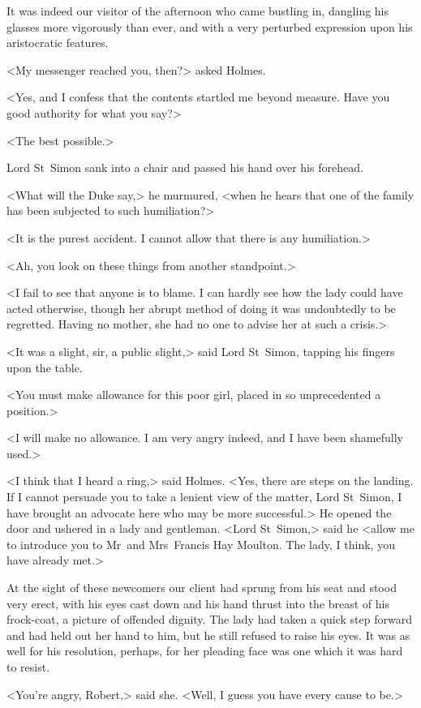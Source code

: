It was indeed our visitor of the afternoon who came bustling in, dangling his glasses more vigorously than ever, and with a very perturbed expression upon his aristocratic features.

<My messenger reached you, then?> asked Holmes.

<Yes, and I confess that the contents startled me beyond measure. Have you good authority for what you say?>

<The best possible.>

Lord St~Simon sank into a chair and passed his hand over his forehead.

<What will the Duke say,> he murmured, <when he hears that one of the family has been subjected to such humiliation?>

<It is the purest accident. I cannot allow that there is any humiliation.>

<Ah, you look on these things from another standpoint.>

<I fail to see that anyone is to blame. I can hardly see how the lady could have acted otherwise, though her abrupt method of doing it was undoubtedly to be regretted. Having no mother, she had no one to advise her at such a crisis.>

<It was a slight, sir, a public slight,> said Lord St~Simon, tapping his fingers upon the table.

<You must make allowance for this poor girl, placed in so unprecedented a position.>

<I will make no allowance. I am very angry indeed, and I have been shamefully used.>

<I think that I heard a ring,> said Holmes. <Yes, there are steps on the landing. If I cannot persuade you to take a lenient view of the matter, Lord St~Simon, I have brought an advocate here who may be more successful.> He opened the door and ushered in a lady and gentleman. <Lord St~Simon,> said he <allow me to introduce you to Mr~and Mrs~Francis Hay Moulton. The lady, I think, you have already met.>

At the sight of these newcomers our client had sprung from his seat and stood very erect, with his eyes cast down and his hand thrust into the breast of his frock-coat, a picture of offended dignity. The lady had taken a quick step forward and had held out her hand to him, but he still refused to raise his eyes. It was as well for his resolution, perhaps, for her pleading face was one which it was hard to resist.

<You're angry, Robert,> said she. <Well, I guess you have every cause to be.>


